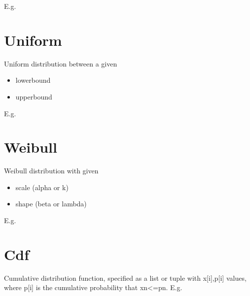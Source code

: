 \documentclass[letterpaper,10pt,english]{sphinxmanual}
\begin{document}
E.g.

\begin{sphinxVerbatim}[commandchars=\\\{\}]
    
\end{sphinxVerbatim}


\section{Uniform}
\label{\detokenize{Distributions:uniform}}
Uniform distribution between a given
\begin{itemize}
\item {} 
lowerbound

\item {} 
upperbound

\end{itemize}

E.g.

\begin{sphinxVerbatim}[commandchars=\\\{\}]
   
\end{sphinxVerbatim}


\section{Weibull}
\label{\detokenize{Distributions:weibull}}
Weibull distribution with given
\begin{itemize}
\item {} 
scale (alpha or k)

\item {} 
shape (beta or lambda)

\end{itemize}

E.g.

\begin{sphinxVerbatim}[commandchars=\\\{\}]
     
\end{sphinxVerbatim}


\section{Cdf}
\label{\detokenize{Distributions:cdf}}
Cumulative distribution function, specified as a list or tuple with x{[}i{]},p{[}i{]} values, where p{[}i{]} is the cumulative probability
that xn\textless{}=pn. E.g.
\end{document}
